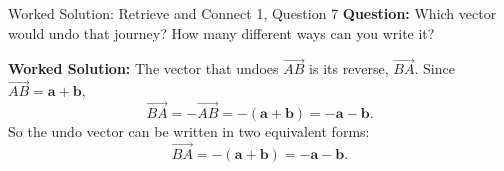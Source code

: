 \documentclass{beamer}
\begin{document}
\begin{frame}{Worked Solution: Retrieve and Connect 1, Question 7}
\textbf{Question:} Which vector would undo that journey? How many different ways can you write it?

\textbf{Worked Solution:}
The vector that undoes \(\overrightarrow{AB}\) is its reverse, \(\overrightarrow{BA}\). Since \(\overrightarrow{AB}=\mathbf{a}+\mathbf{b}\),
\[
\overrightarrow{BA}
=
-\overrightarrow{AB}
=
-(\mathbf{a}+\mathbf{b})
=
-\mathbf{a}-\mathbf{b}.
\]
So the undo vector can be written in two equivalent forms:
\[
\overrightarrow{BA}
=
-(\mathbf{a}+\mathbf{b})
=
-\mathbf{a}-\mathbf{b}.
\]

\end{frame}
\end{document}
